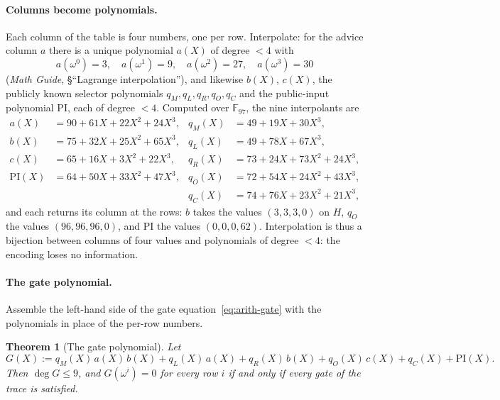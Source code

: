 \documentclass[11pt,a4paper]{article}
\newtheorem{theorem}{Theorem}[section]
\theoremstyle{definition}
\newcommand{\F}{\mathbb{F}}
\begin{document}
\paragraph{Columns become polynomials.}
Each column of the table is four numbers, one per row. Interpolate: for
the advice column $a$ there is a unique polynomial $a(X)$ of degree $< 4$
with
\[
a(\omega^0) = 3, \quad a(\omega^1) = 9, \quad a(\omega^2) = 27, \quad
a(\omega^3) = 30
\]
(\emph{Math Guide}, \S``Lagrange interpolation''), and likewise $b(X)$,
$c(X)$, the publicly known selector polynomials $q_M, q_L, q_R, q_O, q_C$
and the public-input polynomial $\mathrm{PI}$, each of degree $< 4$.
Computed over $\F_{97}$, the nine interpolants are
\begin{align*}
a(X) &= 90 + 61X + 22X^2 + 24X^3, &
q_M(X) &= 49 + 19X + 30X^3, \\
b(X) &= 75 + 32X + 25X^2 + 65X^3, &
q_L(X) &= 49 + 78X + 67X^3, \\
c(X) &= 65 + 16X + 3X^2 + 22X^3, &
q_R(X) &= 73 + 24X + 73X^2 + 24X^3, \\
\mathrm{PI}(X) &= 64 + 50X + 33X^2 + 47X^3, &
q_O(X) &= 72 + 54X + 24X^2 + 43X^3, \\
&& q_C(X) &= 74 + 76X + 23X^2 + 21X^3,
\end{align*}
and each returns its column at the rows: $b$ takes the values
$(3, 3, 3, 0)$ on $H$, $q_O$ the values $(96, 96, 96, 0)$, and
$\mathrm{PI}$ the values $(0, 0, 0, 62)$. Interpolation is thus a
bijection between columns of four values and polynomials of degree
$< 4$: the encoding loses no information.

\paragraph{The gate polynomial.}
Assemble the left-hand side of the gate equation~\eqref{eq:arith-gate}
with the polynomials in place of the per-row numbers.

\begin{theorem}[The gate polynomial]\label{thm:arith-gate-vanish}
Let
\begin{equation}\label{eq:arith-Gpoly}
G(X) := q_M(X)\,a(X)\,b(X) + q_L(X)\,a(X) + q_R(X)\,b(X)
        + q_O(X)\,c(X) + q_C(X) + \mathrm{PI}(X).
\end{equation}
Then $\deg G \le 9$, and $G(\omega^i) = 0$ for every row $i$ if and only if
every gate of the trace is satisfied.
\end{theorem}
\end{document}
